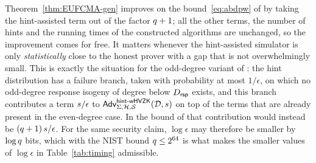 \begin{remark}\label{rem:comparison}
    Theorem~\ref{thm:EUFCMA-gen} improves on the bound~\eqref{eq:abdpw} of
     by taking the hint-assisted
    \wHVZK term out of the factor $q+1$; all the other terms, the
    number of hints and the running times of the constructed algorithms are
    unchanged, so the improvement comes for free. It matters whenever the
    hint-assisted simulator is only \emph{statistically} close to the honest
    prover with a gap that is not overwhelmingly small. This is exactly the
    situation for the odd-degree variant of \sqisign{}: the hint distribution has
    a failure branch, taken with probability at most $1/\epsilon$, on which no
    odd-degree response isogeny of degree below $D_{\mathsf{rsp}}$ exists, and
    this branch contributes a term $s/\epsilon$ to
    $\mathsf{Adv}^{\mathsf{hint}\text{-}\mathsf{wHVZK}}_{\Sigma,\mathcal{H}, \operatorname{\mathcal{S}}}(\mathcal{D}, s)$ on top of the terms
    that are already present in the even-degree case. In the bound
    of  that contribution would instead be
    $(q+1)\,s/\epsilon$. For the same security claim, $\log\epsilon$
    may therefore be smaller by $\log q$ bits, which with the NIST bound
    $q \leq 2^{64}$ is what makes the smaller values of $\log \epsilon$ in
    Table~\ref{tab:timing} admissible.
\end{remark}

